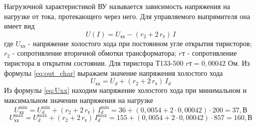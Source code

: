 Нагрузочной характеристикой ВУ называется зависимость напряжения на нагрузке от тока, протекающего через него. Для управляемого выпрямителя она имеет вид
\begin{equation}
 \label{eq:out_char}
 U(I) = U_{\text{хх}} - (r_2 + 2 \, r_{\text{т}}) \, I
\end{equation}
где $U_{\text{хх}}$ - напряжение холостого хода при постоянном угле открытия тиристоров; $r_2$ - сопротивление вторичной обмотки трансформатора; $r{\text{т}}$ - сопротивление тиристора в открытом состоянии. Для тиристора Т133-500 $r{\text{т}} = 0,00042$ Ом. Из формулы \eqref{eq:out_char} выражаем значение напряжения холостого хода
\begin{equation}
 \label{eq:Uxx}
 U_{\text{хх}} = U_d + (r_2 + 2 \, r_{\text{т}}) \, I_d
\end{equation}
Из формулы \eqref{eq:Uxx} находим напряжение холостого хода при минимальном и максимальном значении напряжения на нагрузке
\begin{equation}
\label{eq:Uxxmin}
 U_{\text{хх}}^{\min} = U_d^{\min} + (r_2 + 2 \, r_{\text{т}}) \, I_d^{\min} = 36 + (0,0054 + 2 \cdot 0,00042) \cdot 200 = 37, \text{В}
\end{equation}
\begin{equation}
\label{eq:Uxxmax}
 U_{\text{хх}}^{\max} = U_d^{\max} + (r_2 + 2 \, r_{\text{т}}) \, I_d^{\max} = 155 + (0,0054 + 2 \cdot 0,00042) \cdot 857 = 160, \text{В}
\end{equation}









